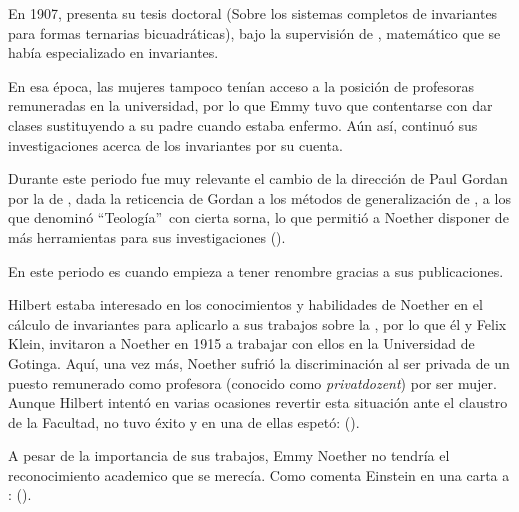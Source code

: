 En 1907, presenta su tesis doctoral  (Sobre los sistemas completos de invariantes para formas ternarias bicuadráticas), bajo la supervisión de , matemático que se había especializado en invariantes.

En esa época, las mujeres tampoco tenían acceso a la posición de profesoras remuneradas en la universidad, por lo que Emmy tuvo que contentarse con dar clases sustituyendo a su padre cuando estaba enfermo.
Aún así, continuó sus investigaciones acerca de los invariantes por su cuenta.

Durante este periodo fue muy relevante el cambio de la dirección de Paul Gordan por la de , dada la reticencia de Gordan a los métodos de generalización de , a los que denominó \textquotedblleft Teología\textquotedblright\ con cierta sorna, lo que permitió a Noether disponer de más herramientas para sus investigaciones (\cite{Weyl}).

En este periodo es cuando empieza a tener renombre gracias a sus publicaciones.

Hilbert estaba interesado en los conocimientos y habilidades de Noether en el cálculo de invariantes para aplicarlo a sus trabajos sobre la ,
por lo que él y Felix Klein, invitaron a Noether en 1915 a trabajar con ellos en la Universidad de Gotinga.
Aquí, una vez más, Noether sufrió la discriminación al ser privada de un puesto remunerado como profesora (conocido como \textit{privatdozent}) por ser mujer.
Aunque Hilbert intentó en varias ocasiones revertir esta situación ante el claustro de la Facultad, no tuvo éxito y en una de ellas espetó:  (\cite[332]{Carrasco}).

A pesar de la importancia de sus trabajos, Emmy Noether no tendría el reconocimiento academico que se merecía.
Como comenta Einstein en una carta a :  (\cite{Kimberling}).

